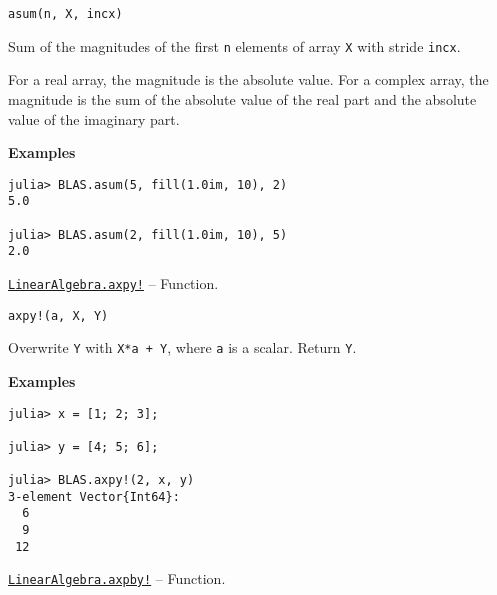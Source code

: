 \begin{adjustwidth}{2em}{0pt}


\begin{verbatim}
asum(n, X, incx)
\end{verbatim}

Sum of the magnitudes of the first \texttt{n} elements of array \texttt{X} with stride \texttt{incx}.

For a real array, the magnitude is the absolute value. For a complex array, the magnitude is the sum of the absolute value of the real part and the absolute value of the imaginary part.

\textbf{Examples}


\begin{verbatim}
julia> BLAS.asum(5, fill(1.0im, 10), 2)
5.0

julia> BLAS.asum(2, fill(1.0im, 10), 5)
2.0
\end{verbatim}



\end{adjustwidth}
\hypertarget{1249554703870980233}{}
\hyperlink{1249554703870980233}{\texttt{LinearAlgebra.axpy!}}  -- {Function.}

\begin{adjustwidth}{2em}{0pt}


\begin{verbatim}
axpy!(a, X, Y)
\end{verbatim}

Overwrite \texttt{Y} with \texttt{X*a + Y}, where \texttt{a} is a scalar. Return \texttt{Y}.

\textbf{Examples}


\begin{verbatim}
julia> x = [1; 2; 3];

julia> y = [4; 5; 6];

julia> BLAS.axpy!(2, x, y)
3-element Vector{Int64}:
  6
  9
 12
\end{verbatim}



\end{adjustwidth}
\hypertarget{15769382652026820442}{}
\hyperlink{15769382652026820442}{\texttt{LinearAlgebra.axpby!}}  -- {Function.}

